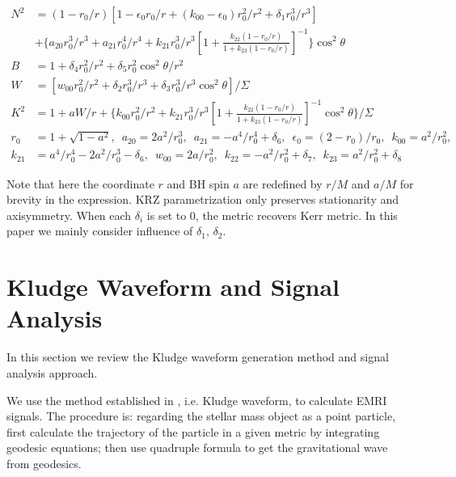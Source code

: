 \documentclass{article}
\begin{document}
\begin{equation}
\begin{aligned}
N^2&=(1-r_0/r)[ 1-\epsilon_0r_0/r +(k_{00}-\epsilon_0)r_0^2/r^2 +\delta_1 r_0^3/r^3 ] \\
&+ \{ a_{20} r_0^3/r^3 +a_{21} r_0^4/r^4 + k_{21}r_0^3/r^3[ 1+\frac{k_{22}(1-r_0/r) }{1+k_{23}(1-r_0/r)} ]^{-1}   \} \cos^2\theta   \\
B&=1+\delta_4r_0^2 /r^2 +\delta_5r_0^2 \cos^2\theta /r^2\\
W&=[w_{00}r_0^2 /r^2 +\delta_2 r_0^3/r^3 +\delta_3 r_0^3/r^3 \cos^2\theta ]/\Sigma\\
K^2&= 1+aW/r+\{k_{00}r_0^2/r^2 +k_{21}r_0^3/r^3 [ 1+\frac{k_{22}(1-r_0/r) }{1+k_{23}(1-r_0/r)} ]^{-1} \cos^2\theta \}/\Sigma\\
r_0&=1+\sqrt{1-a^2},\,\,\, a_{20}=2a^2/r_0^3,\,\,\, a_{21}=-a^4/r_0^4 +\delta_6 ,\,\,\, \epsilon_0=(2-r_0)/r_0,\,\,\, k_{00}=a^2/r_0^2,\\
 k_{21}&=a^4/r_0^4 -2a^2/r_0^3-\delta_6,\,\,\, w_{00}=2a/r_0^2,\,\,\, k_{22}=-a^2/r_0^2 +\delta_7,\,\,\,  k_{23} = a^2/r_0^2 +\delta_8
\end{aligned}
\end{equation}

Note that here the coordinate $r$ and BH spin $a$ are redefined by $r/M$ and $a/M$ for brevity in the expression. KRZ parametrization only preserves stationarity and axisymmetry. When each $\delta_i$ is set to 0, the metric recovers Kerr metric. In this paper we mainly consider influence of $\delta_1, \, \delta_2$.


\section{Kludge Waveform and Signal Analysis}
\label{p_wave}

In this section we review the Kludge waveform generation method and signal analysis approach. 


We use the method established in \cite{kludge}, i.e. Kludge waveform, to calculate EMRI signals. The procedure is: regarding the stellar mass object as a point particle, first calculate the trajectory of the particle in a given metric by integrating geodesic equations; then use quadruple formula to get the gravitational wave from geodesics.
\end{document}
